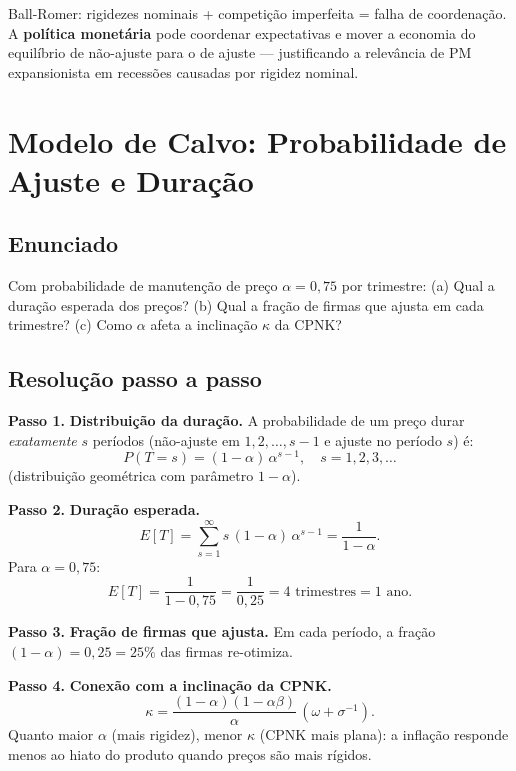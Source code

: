 \documentclass[12pt, a4paper]{article}
\begin{document}
\begin{provabox}[title={Implicação de política (Q2)}]
Ball-Romer: rigidezes nominais + competição imperfeita = falha de coordenação.
A \textbf{política monetária} pode coordenar expectativas e mover a economia do
equilíbrio de não-ajuste para o de ajuste --- justificando a relevância de PM
expansionista em recessões causadas por rigidez nominal.
\end{provabox}

\section{Modelo de Calvo: Probabilidade de Ajuste e Duração}

\subsection*{Enunciado}
Com probabilidade de manutenção de preço $\alpha = 0{,}75$ por trimestre:
(a) Qual a duração esperada dos preços? (b) Qual a fração de firmas que ajusta em
cada trimestre? (c) Como $\alpha$ afeta a inclinação $\kappa$ da CPNK?

\subsection*{Resolução passo a passo}

\textbf{Passo 1.} \textbf{Distribuição da duração.}
A probabilidade de um preço durar \emph{exatamente} $s$ períodos (não-ajuste em
$1, 2, \ldots, s-1$ e ajuste no período $s$) é:
\[
P(T = s) = (1-\alpha)\,\alpha^{s-1}, \quad s = 1, 2, 3, \ldots
\]
(distribuição geométrica com parâmetro $1-\alpha$).

\textbf{Passo 2.} \textbf{Duração esperada.}
\[
E[T] = \sum_{s=1}^{\infty} s\,(1-\alpha)\,\alpha^{s-1} = \frac{1}{1-\alpha}.
\]
Para $\alpha = 0{,}75$:
\[
E[T] = \frac{1}{1-0{,}75} = \frac{1}{0{,}25} = 4 \text{ trimestres} = 1 \text{ ano}.
\]

\textbf{Passo 3.} \textbf{Fração de firmas que ajusta.}
Em cada período, a fração $(1-\alpha) = 0{,}25 = 25\%$ das firmas re-otimiza.

\textbf{Passo 4.} \textbf{Conexão com a inclinação da CPNK.}
\[
\kappa = \frac{(1-\alpha)(1-\alpha\beta)}{\alpha}\,(\omega + \sigma^{-1}).
\]
Quanto maior $\alpha$ (mais rigidez), menor $\kappa$ (CPNK mais plana): a inflação
responde menos ao hiato do produto quando preços são mais rígidos.
\end{document}
